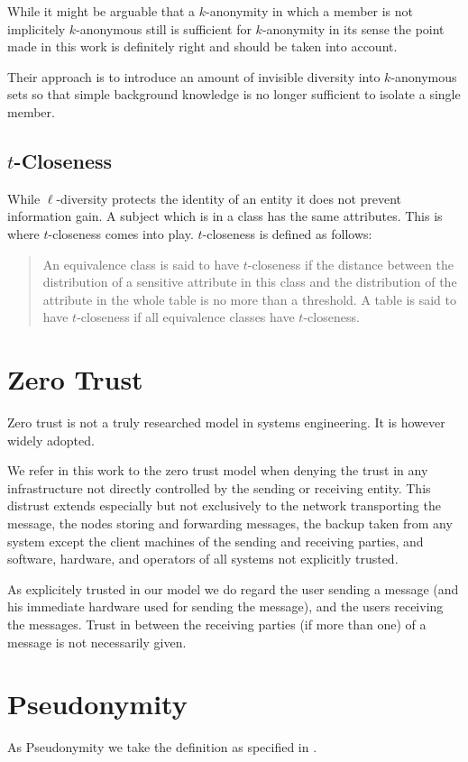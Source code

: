 While it might be arguable that a $k$-anonymity in which a member is not implicitely $k$-anonymous still is sufficient for $k$-anonymity in its sense the point made in this work is definitely right and should be taken into account.

Their approach is to introduce an amount of invisible diversity into $k$-anonymous sets so that simple background knowledge is no longer sufficient to isolate a single member.

\subsection{$t$-Closeness}
While $\ell$-diversity protects the identity of an entity it does not prevent information gain. A subject which is in a class has the same attributes. This is where $t$-closeness\cite{li2007t} comes into play. $t$-closeness is defined as follows:

\begin{quote}
	An equivalence class is said to have $t$-closeness if the distance between the distribution of a sensitive attribute in this class and the distribution of the attribute in the whole table is no more than a threshold. A table is said to have $t$-closeness if all equivalence classes have $t$-closeness.
\end{quote}

\section{Zero Trust}
Zero trust is not a truly researched model in systems engineering. It is however widely adopted. 

We refer in this work to the zero trust model when denying the trust in any infrastructure not directly controlled by the sending or receiving entity. This distrust extends especially but not exclusively to the network transporting the message, the nodes storing and forwarding messages, the backup taken from any system except the client machines of the sending and receiving parties, and software, hardware, and operators of all systems not explicitly trusted.

As explicitely trusted in our model we do regard the user sending a message (and his immediate hardware used for sending the message), and the users receiving the messages. Trust in between the receiving parties (if more than one) of a message is not necessarily given.

\section{Pseudonymity}
As Pseudonymity we take the definition as specified in \cite{anon_terminology}.

